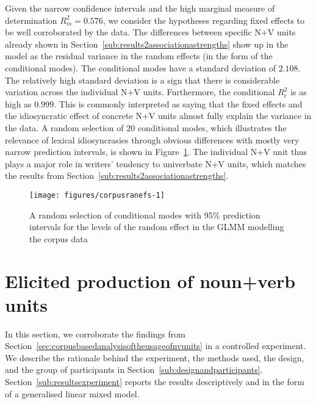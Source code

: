\documentclass[biblatex, charis, linguex]{glossa}\usepackage{knitr}
\begin{document}
Given the narrow confidence intervals and the high marginal measure of determination $R^2_m=0.576$, we consider the hypotheses regarding fixed effects to be well corroborated by the data.
The differences between specific N+V units already shown in Section~\ref{sub:results2associationastrengths} show up in the model as the residual variance in the random effects (in the form of the conditional modes).
The conditional modes have a standard deviation of $2.108$.
The relatively high standard deviation is a sign that there is considerable variation across the individual N+V units.
Furthermore, the conditional $R^2_c$ is as high as $0.999$.
This is commonly interpreted as saying that the fixed effects and the idiosyncratic effect of concrete N+V units almost fully explain the variance in the data.
A random selection of $20$ conditional modes, which illustrates the relevance of lexical idiosyncrasies through obvious differences with mostly very narrow prediction intervals, is shown in Figure~\ref{fig:corpusranefs}.
The individual N+V unit thus plays a major role in writers' tendency to univerbate N+V units, which matches the results from Section~\ref{sub:results2associationastrengths}.

\begin{figure}[!htbp]

{\centering \texttt{[image: figures/corpusranefs-1]} 

}

\caption[A random selection of conditional modes with 95\% prediction intervals for the levels of the random effect in the GLMM modelling the corpus data]{A random selection of conditional modes with 95\% prediction intervals for the levels of the random effect in the GLMM modelling the corpus data}\label{fig:corpusranefs}
\end{figure}






\section{Elicited production of noun+verb units}
\label{sec:elicitedproductionofnounverbunitsinwrittenlanguage}

In this section, we corroborate the findings from Section~\ref{sec:corpusbasedanalysisoftheusageofnvunits} in a controlled experiment.
We describe the rationale behind the experiment, the methods used, the design, and the group of participants in Section~\ref{sub:designandparticipants}.
Section~\ref{sub:resultsexperiment} reports the results descriptively and in the form of a generalised linear mixed model.
\end{document}
